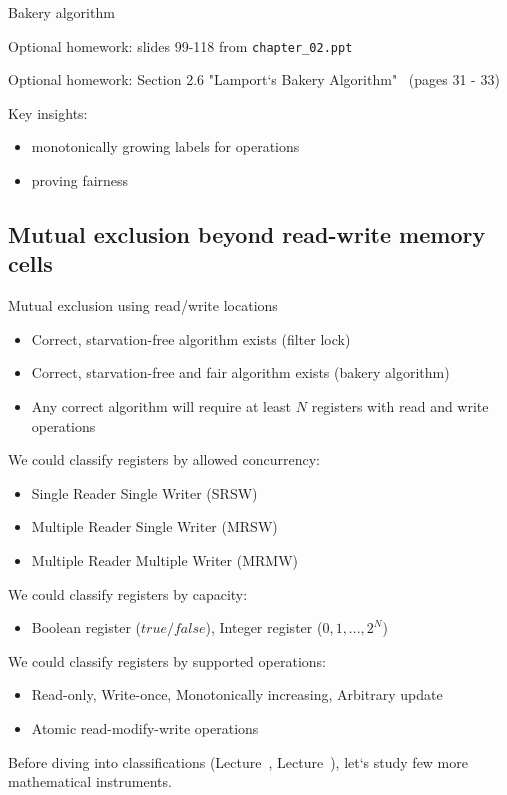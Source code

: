 \begin{frame}[fragile]{Bakery algorithm}

Optional homework: slides 99-118 from \texttt{chapter\_02.ppt}

Optional homework: Section 2.6 "Lamport`s Bakery Algorithm" \ (pages 31 - 33)

Key insights: 
\begin{itemize}
  \item monotonically growing labels for operations
  \item proving fairness
\end{itemize}

\end{frame}

\subsection{Mutual exclusion beyond read-write memory cells}
\showTOCSub

\begin{frame}[fragile]{Mutual exclusion using read/write locations}

\begin{itemize}
  \item Correct, starvation-free algorithm exists (filter lock)
  \item Correct, starvation-free and fair algorithm exists (bakery algorithm)
  \item Any correct algorithm will require at least $N$ registers with read and write operations
\end{itemize}

\pause
We could classify registers by allowed concurrency:
\begin{itemize}
  \item Single Reader Single Writer (SRSW)
  \item Multiple Reader Single Writer (MRSW)
  \item Multiple Reader Multiple Writer (MRMW)
\end{itemize}

\pause
We could classify registers by capacity:
\begin{itemize}
  \item Boolean register ($true/false$), Integer register ($0, 1, ..., 2^N$)
\end{itemize}

\pause
We could classify registers by supported operations:
\begin{itemize}
  \item Read-only, Write-once, Monotonically increasing, Arbitrary update
  \pause
  \item Atomic read-modify-write operations
\end{itemize}

\pause

Before diving into classifications (Lecture~\foundationsPlusNum, Lecture~\atomicsNum), let`s study few more mathematical instruments.

\end{frame}


